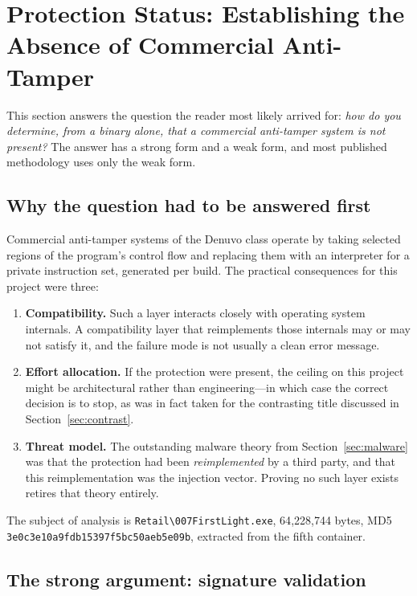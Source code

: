 \section{Protection Status: Establishing the Absence of Commercial Anti-Tamper}
\label{sec:denuvo}

This section answers the question the reader most likely arrived for: \emph{how
do you determine, from a binary alone, that a commercial anti-tamper system is
not present?} The answer has a strong form and a weak form, and most published
methodology uses only the weak form.

\subsection{Why the question had to be answered first}

Commercial anti-tamper systems of the Denuvo class operate by taking selected
regions of the program's control flow and replacing them with an interpreter for
a private instruction set, generated per build. The practical consequences for
this project were three:

\begin{enumerate}
\item \textbf{Compatibility.} Such a layer interacts closely with operating
      system internals. A compatibility layer that reimplements those internals
      may or may not satisfy it, and the failure mode is not usually a clean
      error message.
\item \textbf{Effort allocation.} If the protection were present, the ceiling on
      this project might be architectural rather than engineering---in which case
      the correct decision is to stop, as was in fact taken for the contrasting
      title discussed in Section~\ref{sec:contrast}.
\item \textbf{Threat model.} The outstanding malware theory from
      Section~\ref{sec:malware} was that the protection had been
      \emph{reimplemented} by a third party, and that this reimplementation was
      the injection vector. Proving no such layer exists retires that theory
      entirely.
\end{enumerate}

The subject of analysis is \verb|Retail\007FirstLight.exe|, 64{,}228{,}744 bytes,
MD5 \verb|3e0c3e10a9fdb15397f5bc50aeb5e09b|, extracted from the fifth container.

\subsection{The strong argument: signature validation}
\label{sec:sig}

